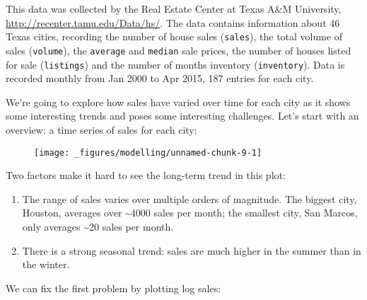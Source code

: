 This data was collected by the Real Estate Center at Texas A\&M
University, \url{http://recenter.tamu.edu/Data/hs/}. The data contains
information about 46 Texas cities, recording the number of house sales
(\texttt{sales}), the total volume of sales (\texttt{volume}), the
\texttt{average} and \texttt{median} sale prices, the number of houses
listed for sale (\texttt{listings}) and the number of months inventory
(\texttt{inventory}). Data is recorded monthly from Jan 2000 to Apr
2015, 187 entries for each city.

We're going to explore how sales have varied over time for each city as
it shows some interesting trends and poses some interesting challenges.
Let's start with an overview: a time series of sales for each city:

\begin{Shaded}
\begin{Highlighting}[]
\StringTok{ }
\StringTok{  }\NormalTok{(}\NormalTok{(}  \NormalTok{/}\NormalTok{)}
\end{Highlighting}
\end{Shaded}

\begin{figure}[H]
  \texttt{[image: \_figures/modelling/unnamed-chunk-9-1]}
\end{figure}

Two factors make it hard to see the long-term trend in this plot:

\begin{enumerate}
\def\labelenumi{\arabic{enumi}.}
\item
  The range of sales varies over multiple orders of magnitude. The
  biggest city, Houston, averages over \textasciitilde{}4000 sales per
  month; the smallest city, San Marcos, only averages
  \textasciitilde{}20 sales per month.
\item
  There is a strong seasonal trend: sales are much higher in the summer
  than in the winter.
\end{enumerate}

We can fix the first problem by plotting log sales:

\begin{Shaded}
\begin{Highlighting}[]
\StringTok{ }
\StringTok{  }\NormalTok{(}\NormalTok{(}  \NormalTok{/}\NormalTok{)}
\end{Highlighting}
\end{Shaded}

